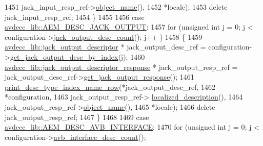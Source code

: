 \begin{DoxyCode}
1451                                                jack\_input\_resp\_ref->\hyperlink{classavdecc__lib_1_1descriptor__response__base_a133f7774946d80f82b8aaaa4cfbb7361}{object\_name}(),
1452                                                *locale);
1453                 \textcolor{keyword}{delete} jack\_input\_resp\_ref;
1454             \}
1455 
1456         \textcolor{keywordflow}{case} \hyperlink{namespaceavdecc__lib_ac7b7d227e46bc72b63ee9e9aae15902fab14c53680e2a06bc1fdd35ae57e30de9}{avdecc\_lib::AEM\_DESC\_JACK\_OUTPUT}:
1457             \textcolor{keywordflow}{for} (\textcolor{keywordtype}{unsigned} \textcolor{keywordtype}{int} j = 0; j < configuration->\hyperlink{classavdecc__lib_1_1configuration__descriptor_aaf9f94d8037864a664f7d3e267df6dd7}{jack\_output\_desc\_count}(); j++
      )
1458             \{
1459                 \hyperlink{classavdecc__lib_1_1jack__output__descriptor}{avdecc\_lib::jack\_output\_descriptor} * jack\_output\_desc\_ref
       = configuration->\hyperlink{classavdecc__lib_1_1configuration__descriptor_ae6a68f83733b54540614b729548a180b}{get\_jack\_output\_desc\_by\_index}(j);
1460                 \hyperlink{classavdecc__lib_1_1jack__output__descriptor__response}{avdecc\_lib::jack\_output\_descriptor\_response} * 
      jack\_output\_resp\_ref = jack\_output\_desc\_ref->\hyperlink{classavdecc__lib_1_1jack__output__descriptor_a326e14cfb01567fe3535428ad3b27f93}{get\_jack\_output\_response}();
1461                 \hyperlink{classcmd__line_ac47c21c03b69593b74e7c43201d0ba41}{print\_desc\_type\_index\_name\_row}(*jack\_output\_desc\_ref,
1462                                                *configuration,
1463                                                jack\_output\_resp\_ref->
      \hyperlink{classavdecc__lib_1_1jack__output__descriptor__response_a1fb9de45567df344090a1407aa6b775f}{localized\_description}(),
1464                                                jack\_output\_resp\_ref->\hyperlink{classavdecc__lib_1_1descriptor__response__base_a133f7774946d80f82b8aaaa4cfbb7361}{object\_name}(),
1465                                                *locale);
1466                 \textcolor{keyword}{delete} jack\_output\_resp\_ref;
1467             \}
1468 
1469         \textcolor{keywordflow}{case} \hyperlink{namespaceavdecc__lib_ac7b7d227e46bc72b63ee9e9aae15902fa5c354fe160628ac90da9257d8e0cb0ee}{avdecc\_lib::AEM\_DESC\_AVB\_INTERFACE}:
1470             \textcolor{keywordflow}{for} (\textcolor{keywordtype}{unsigned} \textcolor{keywordtype}{int} j = 0; j < configuration->\hyperlink{classavdecc__lib_1_1configuration__descriptor_aadd99a4b7397158e900eca5791b773bf}{avb\_interface\_desc\_count}();

\end{DoxyCode}
